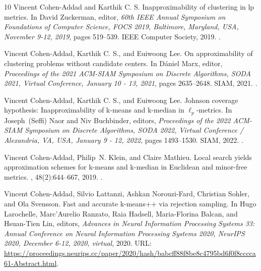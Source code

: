 \documentclass[11pt]{article}
\begin{document}
\begin{thebibliography}{10}
Vincent Cohen{-}Addad and {Karthik {C. S.}}
\newblock Inapproximability of clustering in lp metrics.
\newblock In David Zuckerman, editor, {\em 60th {IEEE} Annual Symposium on
  Foundations of Computer Science, {FOCS} 2019, Baltimore, Maryland, USA,
  November 9-12, 2019}, pages 519--539. {IEEE} Computer Society, 2019.
\newblock \href {https://doi.org/10.1109/FOCS.2019.00040}
  {}.

Vincent Cohen{-}Addad, {Karthik {C. S.}}, and Euiwoong Lee.
\newblock On approximability of clustering problems without candidate centers.
\newblock In D{\'{a}}niel Marx, editor, {\em Proceedings of the 2021 {ACM-SIAM}
  Symposium on Discrete Algorithms, {SODA} 2021, Virtual Conference, January 10
  - 13, 2021}, pages 2635--2648. {SIAM}, 2021.
\newblock \href {https://doi.org/10.1137/1.9781611976465.156}
  {}.

Vincent Cohen{-}Addad, {Karthik {C. S.}}, and Euiwoong Lee.
\newblock Johnson coverage hypothesis: Inapproximability of k-means and
  k-median in $\ell_p$-metrics.
\newblock In Joseph~(Seffi) Naor and Niv Buchbinder, editors, {\em Proceedings
  of the 2022 {ACM-SIAM} Symposium on Discrete Algorithms, {SODA} 2022, Virtual
  Conference / Alexandria, VA, USA, January 9 - 12, 2022}, pages 1493--1530.
  {SIAM}, 2022.
\newblock \href {https://doi.org/10.1137/1.9781611977073.63}
  {}.

Vincent Cohen{-}Addad, Philip~N. Klein, and Claire Mathieu.
\newblock Local search yields approximation schemes for k-means and k-median in
  {Euclidean} and minor-free metrics.
, 48(2):644--667, 2019.
\newblock \href {https://doi.org/10.1137/17M112717X}
  {}.

Vincent Cohen{-}Addad, Silvio Lattanzi, Ashkan Norouzi{-}Fard, Christian
  Sohler, and Ola Svensson.
\newblock Fast and accurate {\textdollar}k{\textdollar}-means++ via rejection
  sampling.
\newblock In Hugo Larochelle, Marc'Aurelio Ranzato, Raia Hadsell,
  Maria{-}Florina Balcan, and Hsuan{-}Tien Lin, editors, {\em Advances in
  Neural Information Processing Systems 33: Annual Conference on Neural
  Information Processing Systems 2020, NeurIPS 2020, December 6-12, 2020,
  virtual}, 2020.
\newblock URL:
  \url{https://proceedings.neurips.cc/paper/2020/hash/babcff88f8be8c4795bd6f0f8cccca61-Abstract.html}.


\end{thebibliography}
\end{document}

